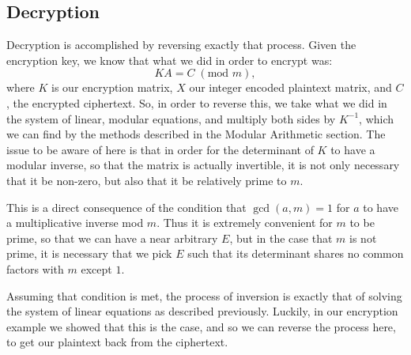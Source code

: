 \documentclass{article}
\begin{document}
\subsection{Decryption}
Decryption is accomplished by reversing exactly that process. Given the encryption key, we know that what we did in order to encrypt was:
\[
    K A = C \; (\text{mod } m),
\]
where $K$ is our encryption matrix, $X$ our integer encoded plaintext matrix, and $C$, the encrypted ciphertext. So, in order to reverse this, we take what we did in the system of linear, modular equations, and multiply both sides by $K^{-1}$, which we can find by the methods described in the Modular Arithmetic section. The issue to be aware of here is that in order for the determinant of $K$ to have a modular inverse, so that the matrix is actually invertible, it is not only necessary that it be non-zero, but also that it be relatively prime to $m$. \medskip

\noindent This is a direct consequence of the condition that $\gcd(a, m) = 1$ for $a$ to have a multiplicative inverse mod $m$. Thus it is extremely convenient for $m$ to be prime, so that we can have a near arbitrary $E$, but in the case that $m$ is not prime, it is necessary that we pick $E$ such that its determinant shares no common factors with $m$ except $1$. \medskip

\noindent Assuming that condition is met, the process of inversion is exactly that of solving the system of linear equations as described previously. Luckily, in our encryption example we showed that this is the case, and so we can reverse the process here, to get our plaintext back from the ciphertext. \medskip
\end{document}
